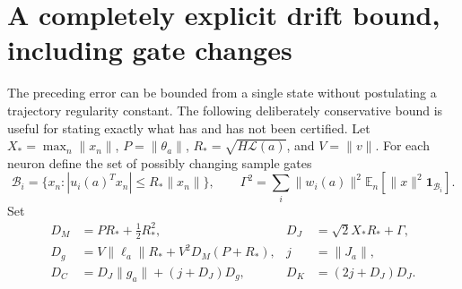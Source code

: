 \documentclass[10pt]{article}
\newcommand{\E}{\mathbb E}
\begin{document}
\section{A completely explicit drift bound, including gate changes}
The preceding error can be bounded from a single state without postulating a
trajectory regularity constant. The following deliberately conservative bound
is useful for stating exactly what has and has not been certified.
Let $X_* = \max_n\|x_n\|$, $P=\|\theta_a\|$,
$R_* = \sqrt{H\mathcal L(a)}$, and $V=\|v\|$.
For each neuron define the set of possibly changing sample gates
\[
 \mathcal B_i=\{x_n:|u_i(a)^Tx_n|\le R_*\|x_n\|\},\qquad
 \Gamma^2=\sum_i\|w_i(a)\|^2\E_n[\|x\|^2\mathbf1_{\mathcal B_i}].
\]
Set
\begin{align*}
 D_M&=PR_*+\tfrac12R_*^2,&
 D_J&=\sqrt2 X_*R_*+\Gamma,\\
 D_g&=V\|\ell_a\|R_*+V^2D_M(P+R_*),& j&=\|J_a\|,\\
 D_C&=D_J\|g_a\|+(j+D_J)D_g,&
 D_K&=(2j+D_J)D_J.
\end{align*}
\end{document}
